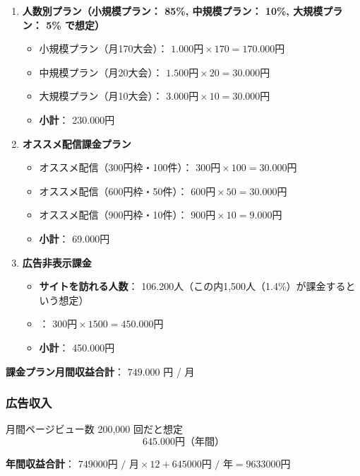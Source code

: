 \begin{enumerate}
    \item \textbf{人数別プラン（小規模プラン： 85\%, 中規模プラン： 10\%, 大規模プラン： 5\% で想定）}
    \begin{itemize}
        \item 小規模プラン（月170大会）： $\num{1,000} \text{円} \times 170 = \num{170,000} \text{円}$
        \item 中規模プラン（月20大会）： $\num{1,500} \text{円} \times 20 = \num{30,000} \text{円}$
        \item 大規模プラン（月10大会）： $\num{3,000} \text{円} \times 10 = \num{30,000} \text{円}$
        \item \textbf{小計}： \num{230,000}円
    \end{itemize}

    \item \textbf{オススメ配信課金プラン}
    \begin{itemize}
        \item オススメ配信（\num{300}円枠・100件）： $\num{300} \text{円} \times 100 = \num{30,000} \text{円}$
        \item オススメ配信（\num{600}円枠・50件）： $\num{600} \text{円} \times 50 = \num{30,000} \text{円}$
        \item オススメ配信（\num{900}円枠・10件）： $\num{900} \text{円} \times 10 = \num{9,000} \text{円}$
        \item \textbf{小計}： \num{69,000}円
    \end{itemize}

    \item \textbf{広告非表示課金}
    \begin{itemize}
        \item \textbf{サイトを訪れる人数}： \num{106,200}人（この内1,500人（1.4\%）が課金するという想定）
        \item ： $\num{300} \text{円} \times 1500 = \num{450,000} \text{円}$
        \item \textbf{小計}： \num{450,000}円
    \end{itemize}
\end{enumerate}

\noindent\textbf{課金プラン月間収益合計}： $\num{749,000}$ 円 / 月

\subsubsection*{広告収入}
月間ページビュー数 200,000 回だと想定
\[
\num{645,000} \text{円（年間）}
\]

\noindent\textbf{年間収益合計}： $\num{749000} \text{円 / 月} \times 12 + \num{645000} \text{円 / 年} = \num{9633000} \text{円}$